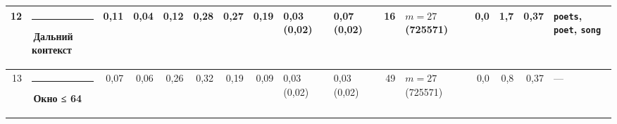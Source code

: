 \documentclass[10pt]{article}
\begin{document}
\begin{minipage}{\linewidth}
\begin{center}
{\begin{tabular}{|r|l|r|r|r|r|r|r|l|l|r|l|r|r|r|l|}
12 & \textcolor[HTML]{C3C2B7}{\rule{0.62em}{0.62em}}\,Дальний контекст & 0,11 & 0,04 & 0,12 & 0,28 & 0,27 & 0,19 & 0,03 (0,02) & 0,07 (0,02) & 16 & $m{=}27$ (725571) & 0,0 & 1,7 & 0,37 & \texttt{\textvisiblespace{}poets}, \texttt{\textvisiblespace{}poet}, \texttt{\textvisiblespace{}song} \\ \hline
13 & \textcolor[HTML]{EDA100}{\rule{0.62em}{0.62em}}\,\textbf{Окно ≤ 64} & 0,07 & 0,06 & 0,26 & 0,32 & 0,19 & 0,09 & 0,03 (0,02) & 0,03 (0,02) & 49 & $m{=}27$ (725571) & 0,0 & 0,8 & 0,37 & — \\ \hline
\hline\end{tabular}}\end{center}
\end{minipage}
\par\vspace{0.4em}
\noindent\begin{minipage}{\linewidth}

\end{minipage}
\end{document}
